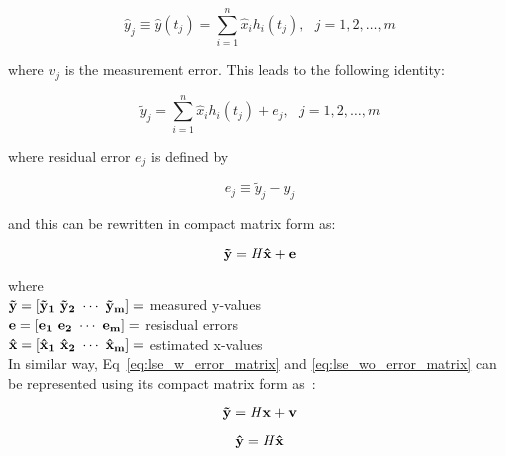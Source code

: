 \begin{equation}
    \hat{y}_{j} \equiv \hat{y}(t_{j}) = \sum_{i = 1}^{n}{\hat{x}_{i} h_{i}(t_{j})},~~~j = 1, 2, \ldots, m
    \label{eq:lse_wo_error}
\end{equation}

where $v_{j}$ is the measurement error. This leads to the following identity:

\begin{equation}
    \tilde{y}_{j} = \sum_{i = 1}^{n}{\hat{x}_{i} h_{i}(t_{j}) + e_{j}},~~~j = 1, 2, \ldots, m
    \label{eq:lse_w_rerror}
\end{equation}

where residual error $e_{j}$ is defined by

\begin{equation}
    e_{j} \equiv \tilde{y}_{j} - \hat{y}_{j}
    \label{eq:residual_error}
\end{equation}

and this can be rewritten in compact matrix form as:

\begin{equation}
    \bf{\tilde{y}} = \bf{\it{H}} \bf{\hat{x}} + \bf{e}
\end{equation}

where ~\cite{crassidis2004dynamic} \\

$\bf{\tilde{y}} = \left[ \tilde{y}_{1} ~ \tilde{y}_{2} ~ \cdots ~ \tilde{y}_{m} \right] = $ measured y-values \\

$\bf{e} = \left[ e_{1} ~ e_{2} ~ \cdots ~ e_{m} \right] = $ resisdual errors \\

$\bf{\hat{x}} = \left[ \hat{x}_{1} ~ \hat{x}_{2} ~ \cdots ~ \hat{x}_{m} \right] = $ estimated x-values \\

In similar way, Eq~\ref{eq:lse_w_error_matrix} and \ref{eq:lse_wo_error_matrix} can be represented using its compact matrix form as~\cite{crassidis2004dynamic}:

\begin{equation}
    \bf{\tilde{y}} = \bf{\it{H}} \bf{x} + \bf{v}
    \label{eq:lse_w_error_matrix}
\end{equation}

\begin{equation}
    \bf{\hat{y}} = \bf{\it{H}} \bf{\hat{x}}
    \label{eq:lse_wo_error_matrix}
\end{equation}


